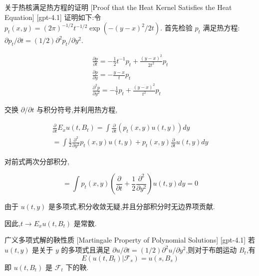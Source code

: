 \documentclass[UTF8]{ctexart}
\begin{document}
    \begin{prf}
        {关于热核满足热方程的证明}
        [Proof that the Heat Kernel Satisfies the Heat Equation]
        [gpt-4.1]
        证明如下:令 $p_{t}(x, y) = (2 \pi)^{-1/2} t^{-1/2} \exp(-(y - x)^{2} / 2t)$.
首先检验 $p_{t}$ 满足热方程:$\partial p_{t} / \partial t = (1/2) \partial^{2} p_{t} / \partial y^{2}$.

\[
\begin{array}{l}
\displaystyle \frac{\partial p}{\partial t} = -\frac{1}{2} t^{-1} p_{t} + \frac{(y - x)^{2}}{2 t^{2}} p_{t} \\
\displaystyle \frac{\partial p}{\partial y} = -\frac{y - x}{t} p_{t} \\
\displaystyle \frac{\partial^{2} p}{\partial y^{2}} = -\frac{1}{t} p_{t} + \frac{(y - x)^{2}}{t^{2}} p_{t}
\end{array}
\]

交换 $\partial / \partial t$ 与积分符号,并利用热方程,

\[
\begin{array}{l}
\displaystyle \frac{\partial}{\partial t} E_{x} u(t, B_{t}) = \int \frac{\partial}{\partial t} (p_{t}(x, y) u(t, y)) dy \\
\displaystyle = \int \frac{1}{2} \frac{\partial^{2}}{\partial y^{2}} p_{t}(x, y) u(t, y) + p_{t}(x, y) \frac{\partial}{\partial t} u(t, y) dy
\end{array}
\]

对前式两次分部积分,

\[
= \int p_{t}(x, y) \left( \frac{\partial}{\partial t} + \frac{1}{2} \frac{\partial^{2}}{\partial y^{2}} \right) u(t, y) dy = 0
\]

由于 $u(t, y)$ 是多项式,积分收敛无疑,并且分部积分时无边界项贡献.

因此,$t \to E_{x} u(t, B_{t})$ 是常数.

    \end{prf}
    
    
    
    \begin{thm}
        {广义多项式解的鞅性质}
        [Martingale Property of Polynomial Solutions]
        [gpt-4.1]
        若 $u(t, y)$ 是关于 $y$ 的多项式且满足 $\partial u / \partial t = (1/2) \partial^{2} u / \partial y^{2}$,则对于布朗运动 $B_t$,有
\[
E(u(t, B_{t}) | \mathcal{F}_{s}) = u(s, B_{s})
\]
即 $u(t, B_t)$ 是 $\mathcal{F}_t$ 下的鞅.

    \end{thm}
    
\end{document}
